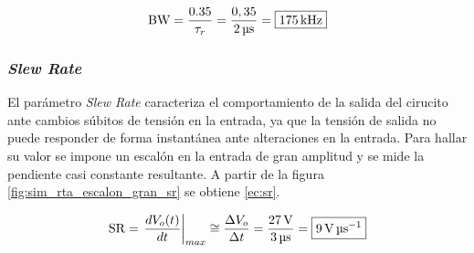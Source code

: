 	\begin{equation}
		\centering
		\mathrm{BW} = \frac{\num{0,35}}{\tau_r} = \frac{0,35}{\SI{2}{\micro\second}} = \boxed{\SI{175}{\kilo\hertz}}
		\label{ec:bw}
	\end{equation}

\subsubsection{\textit{Slew Rate}}



	El parámetro \textit{Slew Rate} caracteriza el comportamiento de la salida del cirucito ante cambios súbitos de tensión en la entrada, ya que la tensión de salida no puede responder de forma instantánea ante alteraciones en la entrada. Para hallar su valor se impone un escalón en la entrada de gran amplitud y se mide la pendiente casi constante resultante. A partir de la figura \ref{fig:sim_rta_escalon_gran_sr} se obtiene \eqref{ec:sr}.

	\begin{equation}
	\centering
	\mathrm{SR} = \left. \frac{dV_o(t)}{dt} \right\rvert_{max} \cong \frac{\Delta V_o}{\Delta t} = \frac{\SI{27}{\volt}}{\SI{3}{\micro\second}} = \boxed{\SI{9}{\volt\per\micro\second}}
	\label{ec:sr}
\end{equation}


